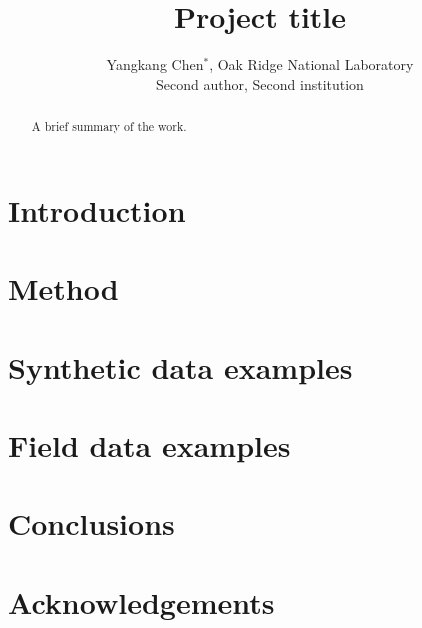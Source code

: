 \title{Project title}
\author{Yangkang Chen$^*$, Oak Ridge National Laboratory\\
        Second author, Second institution}
\maketitle

\begin{abstract}
A brief summary of the work.
\end{abstract}

\newpage

\section{Introduction}

\section{Method}

\section{Synthetic data examples}

\section{Field data examples}

 
\section{Conclusions}


\section{Acknowledgements}


































